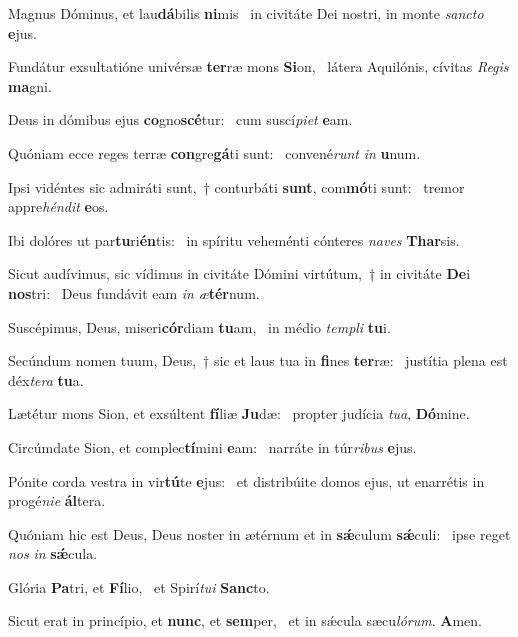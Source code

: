 \item Magnus Dóminus, et lau\textbf{dá}bilis \textbf{ni}mis~\psstar{} in civitáte Dei nostri, in monte \textit{sancto} \textbf{e}jus.
\item Fundátur exsultatióne univérsæ \textbf{ter}ræ mons \textbf{Si}on,~\psstar{} látera Aquilónis, cívitas \textit{Regis} \textbf{ma}gni.
\item Deus in dómibus ejus \textbf{co}gno\textbf{scé}tur:~\psstar{} cum suscí\textit{piet} \textbf{e}am.
\item Quóniam ecce reges terræ \textbf{con}gre\textbf{gá}ti sunt:~\psstar{} convené\textit{runt} \textit{in} \textbf{u}num.
\item Ipsi vidéntes sic admiráti sunt,~† conturbáti \textbf{sunt}, com\textbf{mó}ti sunt:~\psstar{} tremor appre\textit{héndit} \textbf{e}os.
\item Ibi dolóres ut par\textbf{tu}ri\textbf{én}tis:~\psstar{} in spíritu veheménti cónteres \textit{naves} \textbf{Thar}sis.
\item Sicut audívimus, sic vídimus in civitáte Dómini virtútum,~† in civitáte \textbf{De}i \textbf{nos}tri:~\psstar{} Deus fundávit eam \textit{in} \textit{æ}\textbf{tér}num.
\item Suscépimus, Deus, miseri\textbf{cór}diam \textbf{tu}am,~\psstar{} in médio \textit{templi} \textbf{tu}i.
\item Secúndum nomen tuum, Deus,~† sic et laus tua in \textbf{fi}nes \textbf{ter}ræ:~\psstar{} justítia plena est déx\textit{tera} \textbf{tu}a.
\item Lætétur mons Sion, et exsúltent \textbf{fí}liæ \textbf{Ju}dæ:~\psstar{} propter judícia \textit{tua}, \textbf{Dó}mine.
\item Circúmdate Sion, et complec\textbf{tí}mini \textbf{e}am:~\psstar{} narráte in túr\textit{ribus} \textbf{e}jus.
\item Pónite corda vestra in vir\textbf{tú}te \textbf{e}jus:~\psstar{} et distribúite domos ejus, ut enarrétis in progé\textit{nie} \textbf{ál}tera.
\item Quóniam hic est Deus, Deus noster in ætérnum et in \textbf{sǽ}culum \textbf{sǽ}culi:~\psstar{} ipse reget \textit{nos} \textit{in} \textbf{sǽ}cula.
\item Glória \textbf{Pa}tri, et \textbf{Fí}lio,~\psstar{} et Spirí\textit{tui} \textbf{Sanc}to.
\item Sicut erat in princípio, et \textbf{nunc}, et \textbf{sem}per,~\psstar{} et in sǽcula sæcu\textit{lórum}. \textbf{A}men.